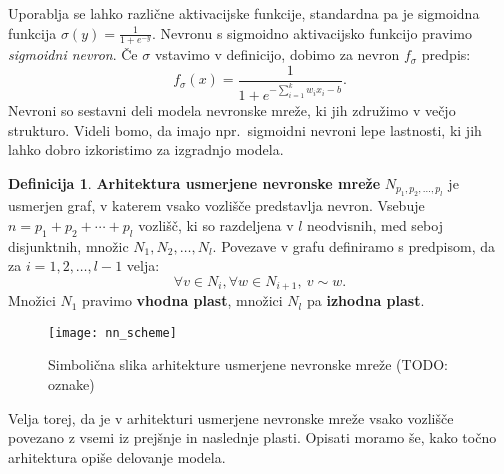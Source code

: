 \documentclass[12pt,a4paper,twoside]{article}
\theoremstyle{definition} %
\newtheorem{definicija}{Definicija}[section]
\theoremstyle{plain} %
\numberwithin{equation}{section}  %
\begin{document}
Uporablja se lahko različne aktivacijske funkcije, standardna pa je sigmoidna funkcija $\sigma(y) = \frac{1}{1+e^{-y}}$. 
Nevronu s sigmoidno aktivacijsko funkcijo pravimo \emph{sigmoidni nevron}. Če $\sigma$ vstavimo v definicijo, dobimo za nevron $f_{\sigma}$ predpis:
\[
f_{\sigma}(x)= \frac{1}{1+e^{-\sum_{i=1}^k w_i x_i - b}}.
\]
Nevroni so sestavni deli modela nevronske mreže, ki jih združimo v večjo strukturo. 
Videli bomo, da imajo npr.\ sigmoidni nevroni lepe lastnosti, ki jih lahko dobro izkoristimo za izgradnjo modela.

\begin{definicija}
\textbf{Arhitektura usmerjene nevronske mreže} $N_{p_1,p_2,\ldots,p_l}$ je usmerjen graf, v katerem vsako vozlišče predstavlja nevron. 
Vsebuje $n= p_1+p_2+\cdots+p_l$ vozlišč, ki so razdeljena v $l$ neodvisnih, med seboj disjunktnih, množic $N_1, N_2, \ldots, N_l$. 
Povezave v grafu definiramo s predpisom, da za $i=1,2,\ldots,l-1$ velja:
\[
\forall v \in N_i, \forall w \in N_{i+1},\ v \sim w.
\]
Množici $N_1$ pravimo \textbf{vhodna plast}, množici $N_l$ pa \textbf{izhodna plast}.
\end{definicija}

\begin{figure}[h!]

\begin{center}
\texttt{[image: nn\_scheme]}
\end{center}

\caption{Simbolična slika arhitekture usmerjene nevronske mreže (TODO: oznake)}
\end{figure}

Velja torej, da je v arhitekturi usmerjene nevronske mreže vsako vozlišče povezano z vsemi iz prejšnje in naslednje plasti. 
Opisati moramo še, kako točno arhitektura opiše delovanje modela.
\end{document}
